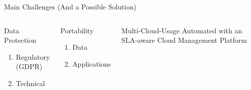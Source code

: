 \documentclass{beamer}
\begin{document}
\begin{frame}{Main Challenges (And a Possible Solution)}
\begin{columns}
\begin{alertblock}{Data Protection}
	\begin{enumerate}
		\item Regulatory (GDPR)
		\item Technical
	\end{enumerate}	
\end{alertblock}
\pause
\begin{alertblock}{Portability}
	\begin{enumerate}
		\item Data
		\item Applications
	\end{enumerate}
\end{alertblock}
\pause
\begin{block}{Multi-Cloud-Usage}
Automated with an SLA-aware \newline Cloud Management Platform
\def\svgwidth{\textwidth}
{\tiny \textsf{
}}
\end{block}
\end{columns}
\end{frame}
\end{document}
